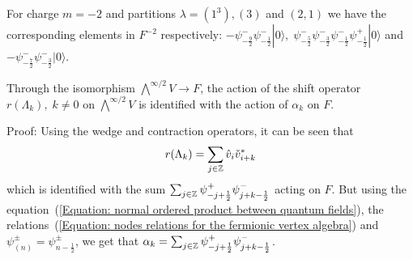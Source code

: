 \begin{dang}
    \begin{example}
        For charge $m=-2$ and partitions $\lambda=(1^3), (3)$ and $(2,1)$ we have the corresponding elements in $F^{-2}$ respectively: $-\psi^-_{-\frac{9}{2}}\psi^-_{-\frac{1}{2}}|0\rangle,\; \psi^-_{-\frac{5}{2}}\psi^-_{-\frac{3}{2}}\psi^-_{-\frac{1}{2}}\psi^+_{-\frac{1}{2}}|0\rangle$ and $-\psi^-_{-\frac{7}{2}}\psi^-_{-\frac{3}{2}}|0\rangle$.
    \end{example}
\end{dang}
\begin{dang}
    \begin{lemma}
        Through the isomorphism $\bigwedge^{\infty/2}V\rightarrow F$, the action of the shift 
        operator $r(\Lambda_k),\; k\neq 0$ on $\bigwedge^{\infty/2}V$ is identified with the action of $\alpha_k$ on $F$.
    \end{lemma}
\end{dang}
Proof: Using the wedge and contraction operators, it can be seen that
\begin{equation}
    r(\Lambda_k)=\sum_{j\in\mathbb{Z}}\hat{v}_i\check{v}_{i+k}^*
\end{equation}
which is identified with the sum $\sum_{j\in\mathbb{Z}}\psi^+_{-j+\frac{1}{2}}\psi^-_{j+k-\frac{1}{2}}$ acting on $F$. But using the equation~(\ref{Equation: normal ordered product between quantum fields}), the relations~(\ref{Equation: nodes relations for the fermionic vertex algebra}) and $\psi^\pm_{(n)}=\psi^\pm_{n-\frac{1}{2}}$, we get that $\alpha_k=\sum_{j\in\mathbb{Z}}\psi^+_{-j+\frac{1}{2}}\psi^-_{j+k-\frac{1}{2}}$.\par

